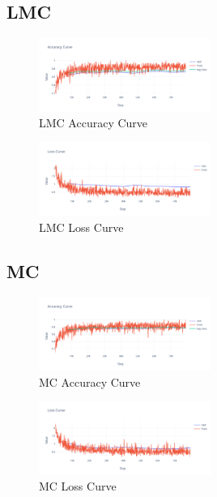 \documentclass[conference]{IEEEtran}
\begin{document}
\subsection{LMC}

\begin{figure}[h]
    \centering
    \includegraphics[width=0.5\textwidth]{images/LMC_accuracy.png}
    \caption{LMC Accuracy Curve}
    \label{fig:LMC_accuracy}
\end{figure}{}

\begin{figure}[h]
    \centering
    \includegraphics[width=0.5\textwidth]{images/LMC_loss.png}
    \caption{LMC Loss Curve}
    \label{fig:LMC_loss}
\end{figure}{}

\subsection{MC}

\begin{figure}[h]
    \centering
    \includegraphics[width=0.5\textwidth]{images/MC_accuracy.png}
    \caption{MC Accuracy Curve}
    \label{fig:MC_accuracy}
\end{figure}{}

\begin{figure}[h]
    \centering
    \includegraphics[width=0.5\textwidth]{images/MC_loss.png}
    \caption{MC Loss Curve}
    \label{fig:MC_loss}
\end{figure}{}
\end{document}
